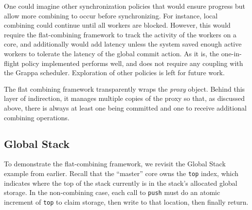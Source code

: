 One could imagine other synchronization policies that would ensure progress but allow more combining to occur before synchronizing. For instance, local combining could continue until all workers are blocked. However, this would require the flat-combining framework to track the activity of the workers on a core, and additionally would add latency unless the system saved enough active workers to tolerate the latency of the global commit action. As it is, the one-in-flight policy implemented performs well, and does not require any coupling with the Grappa scheduler. Exploration of other policies is left for future work.

The flat combining framework transparently wraps the \emph{proxy} object. Behind this layer of indirection, it manages multiple copies of the proxy so that, as discussed above, there is always at least one being committed and one to receive additional combining operations.


\subsection{Global Stack}
To demonstrate the flat-combining framework, we revisit the Global Stack example from earlier. Recall that the ``master'' core owns the \texttt{top} index, which indicates where the top of the stack currently is in the stack's allocated global storage. In the non-combining case, each call to \texttt{push} must do an atomic increment of \texttt{top} to claim storage, then write to that location, then finally return. 



